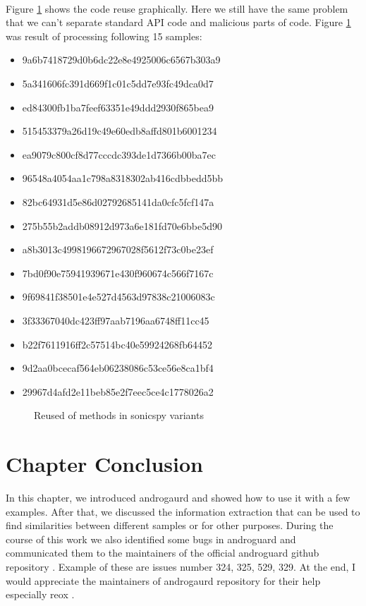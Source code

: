 \documentclass[../main.tex]{subfile}
\begin{document}
		\paragraph{} Figure \ref{fig:sonicspy_graph} shows the code reuse graphically. Here we still have the same problem that we can't separate standard API code and malicious parts of code. Figure \ref{fig:sonicspy_graph} was result of processing following 15 samples:
		\begin{itemize}
			\item 9a6b7418729d0b6dc22e8e4925006c6567b303a9
			\item 5a341606fc391d669f1c01c5dd7e93fc49dca0d7
			\item ed84300fb1ba7feef63351e49ddd2930f865bea9
			\item 515453379a26d19c49e60edb8affd801b6001234
			\item ea9079c800cf8d77cccdc393de1d7366b00ba7ec
			\item 96548a4054aa1c798a8318302ab416cdbbedd5bb
			\item 82bc64931d5e86d02792685141da0cfc5fcf147a
			\item 275b55b2addb08912d973a6e181fd70e6bbe5d90
			\item a8b3013c4998196672967028f5612f73c0be23ef
			\item 7bd0f90e75941939671e430f960674c566f7167c
			\item 9f69841f38501e4e527d4563d97838c21006083c
			\item 3f33367040dc423ff97aab7196aa6748ff11cc45
			\item b22f7611916ff2c57514bc40e59924268fb64452
			\item 9d2aa0bcecaf564eb06238086c53ce56e8ca1bf4
			\item 29967d4afd2e11beb85e2f7eec5ce4c1778026a2
		\end{itemize}
		
		\begin{figure}[H]
			\centering
			\caption{Reused of methods in sonicspy variants}
			\label{fig:sonicspy_graph}			
		\end{figure}
		
		
		\section{Chapter Conclusion} In this chapter, we introduced androgaurd and showed how to use it with a few examples. After that, we discussed the information extraction that can be used to find similarities between different samples or for other purposes. During the course of this work we also identified some bugs in androguard and communicated them to the maintainers of the official androguard github repository \cite{desnos2017androguard}. Example of these are issues number 324, 325, 529, 329. At the end, I would appreciate the maintainers of androgaurd repository for their help especially reox \cite{reox}.
\end{document}
